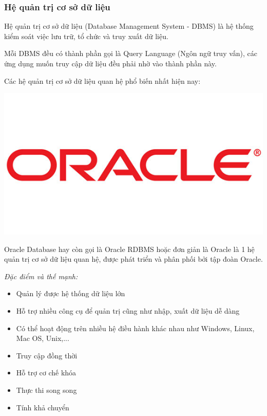 \subsubsection{Hệ quản trị cơ sở dữ liệu}

Hệ quản trị cơ sở dữ liệu (Database Management System - DBMS) là hệ thống kiểm soát việc lưu trữ, tổ chức và truy xuất dữ liệu.

Mỗi DBMS đều có thành phần gọi là Query Language (Ngôn ngữ truy vấn), các ứng dụng muốn truy cập dữ liệu đều phải nhờ vào thành phần này.

Các hệ quản trị cơ sở dữ liệu quan hệ phổ biến nhất hiện nay:
\begin{center}
  \captionsetup{type=figure}
  \includegraphics[scale=0.4]{img/oracle.jpg}
\end{center}

Oracle Database hay còn gọi là Oracle RDBMS hoặc đơn giản là Oracle là 1 hệ quản trị cơ sở dữ liệu quan hệ, được phát triển và phân phối bởi tập đoàn Oracle.

\textit{Đặc điểm và thế mạnh:}
\begin{itemize}
    \item Quản lý được hệ thống dữ liệu lớn
    \item Hỗ trợ nhiều công cụ để quản trị cũng như nhập, xuất dữ liệu dễ dàng
    \item Có thể hoạt động trên nhiều hệ điều hành khác nhau như Windows, Linux, Mac OS, Unix,...
    \item Truy cập đồng thời
    \item Hỗ trợ cơ chế khóa
    \item Thực thi song song
    \item Tính khả chuyển
\end{itemize}

